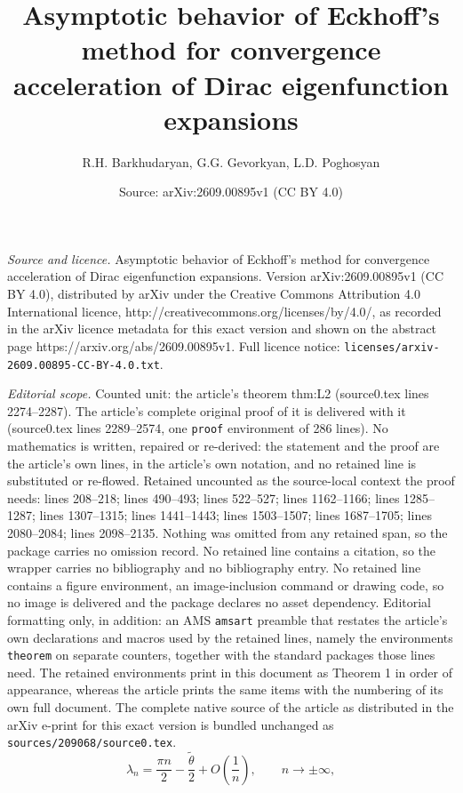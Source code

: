 \documentclass[10pt,a4paper]{amsart}
\title{Asymptotic behavior of Eckhoff's method for convergence acceleration of Dirac eigenfunction expansions}
\author{R.H. Barkhudaryan, G.G. Gevorkyan, L.D. Poghosyan}
\date{Source: arXiv:2609.00895v1 (CC BY 4.0)}
\begin{document}
\maketitle

\noindent\emph{Source and licence.} Asymptotic behavior of Eckhoff's method for convergence acceleration of Dirac eigenfunction expansions. Version arXiv:2609.00895v1 (CC BY 4.0), distributed by arXiv under the Creative Commons Attribution 4.0 International licence, http://creativecommons.org/licenses/by/4.0/, as recorded in the arXiv licence metadata for this exact version and shown on the abstract page https://arxiv.org/abs/2609.00895v1. Full licence notice: \texttt{licenses/arxiv-2609.00895-CC-BY-4.0.txt}.\par\smallskip

\noindent\textit{Editorial scope.} Counted unit: the article's theorem thm:L2 (source0.tex lines 2274--2287). The article's complete original proof of it is delivered with it (source0.tex lines 2289--2574, one \texttt{proof} environment of 286 lines). No mathematics is written, repaired or re-derived: the statement and the proof are the article's own lines, in the article's own notation, and no retained line is substituted or re-flowed.  Retained uncounted as the source-local context the proof needs: lines 208--218; lines 490--493; lines 522--527; lines 1162--1166; lines 1285--1287; lines 1307--1315; lines 1441--1443; lines 1503--1507; lines 1687--1705; lines 2080--2084; lines 2098--2135.  Nothing was omitted from any retained span, so the package carries no omission record.  No retained line contains a citation, so the wrapper carries no bibliography and no bibliography entry.  No retained line contains a figure environment, an image-inclusion command or drawing code, so no image is delivered and the package declares no asset dependency.  Editorial formatting only, in addition: an AMS \texttt{amsart} preamble that restates the article's own declarations and macros used by the retained lines, namely the environments \texttt{theorem} on separate counters, together with the standard packages those lines need.  The retained environments print in this document as Theorem 1 in order of appearance, whereas the article prints the same items with the numbering of its own full document.  The complete native source of the article as distributed in the arXiv e-print for this exact version is bundled unchanged as \texttt{sources/209068/source0.tex}.
\begin{equation}\label{eq:lam-asymp}
\lambda_n
=
\frac{\pi n}{2}
-
\frac{\widetilde\theta}{2}
+
O\!\left(\frac{1}{n}\right),
\qquad
n\to\pm\infty,
\end{equation}
\end{document}
